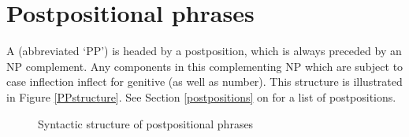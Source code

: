 \section{Postpositional phrases}\label{postpositionalPhrases}
A  (abbreviated ‘PP’) is headed by a postposition, which is always preceded by an NP complement. Any components in this complementing NP which are subject to case inflection inflect for genitive (as well as number). This structure is illustrated in Figure \vref{PPstructure}. 
See Section \ref{postpositions} on \pageref{postpositions} for a list of postpositions. 
\begin{figure}
\caption{Syntactic structure of postpositional phrases}\label{PPstructure}
\end{figure}

